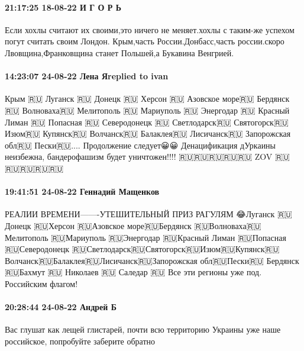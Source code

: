  
 
 
 
 

\paragraph{21:17:25 18-08-22 И Г О Р Ь}

Если хохлы считают их своими,это ничего не меняет.хохлы с таким-же успехом
погут считать своим Лондон. Крым,часть России.Донбасс,часть россии.скоро
Лвовщина,Франковщина станет Польшей,а Букавина Венгрией.

\paragraph{14:23:07 24-08-22 Лена Яreplied to ivan}

Крым 🇷🇺
Луганск 🇷🇺
Донецк 🇷🇺
Херсон 🇷🇺
Азовское море🇷🇺
Бердянск 🇷🇺
Волноваха🇷🇺
Мелитополь 🇷🇺
Мариуполь 🇷🇺
Энергодар 🇷🇺
Красный Лиман 🇷🇺
Попасная 🇷🇺
Северодонецк 🇷🇺
Светлодарск🇷🇺
Святогорск🇷🇺
Изюм🇷🇺
Купянск🇷🇺
Волчанск🇷🇺
Балаклея🇷🇺
Лисичанск🇷🇺
Запорожская обл🇷🇺
Пески🇷🇺....
Продолжение следует😀😀
Денацификация дУркаины неизбежна, бандерофашизм будет уничтожен!!!!
🇷🇺🇷🇺🇷🇺🇷🇺🇷🇺 ZOV 🇷🇺🇷🇺🇷🇺🇷🇺🇷🇺


\paragraph{19:41:51 24-08-22 Геннадий Мащенков}

РЕАЛИИ ВРЕМЕНИ-------УТЕШИТЕЛЬНЫЙ ПРИЗ РАГУЛЯМ 😂Луганск 🇷🇺Донецк 🇷🇺Херсон
🇷🇺Азовское море🇷🇺Бердянск 🇷🇺Волноваха🇷🇺Мелитополь 🇷🇺Мариуполь
🇷🇺Энергодар 🇷🇺Красный Лиман 🇷🇺Попасная 🇷🇺Северодонецк
🇷🇺Светлодарск🇷🇺Святогорск🇷🇺Изюм🇷🇺Купянск🇷🇺Волчанск🇷🇺Балаклея🇷🇺Лисичанск🇷🇺Запорожская
обл🇷🇺Пески🇷🇺 Бердянск 🇷🇺Бахмут 🇷🇺 Николаев 🇷🇺 Саледар 🇷🇺 Все эти
регионы уже под. Российским флагом!

\paragraph{20:28:44 24-08-22 Андрей Б}

Вас глушат как лещей глистарей, почти всю территорию Украины уже наше
российское, попробуйте заберите обратно 🤣🤣🤣🤣

